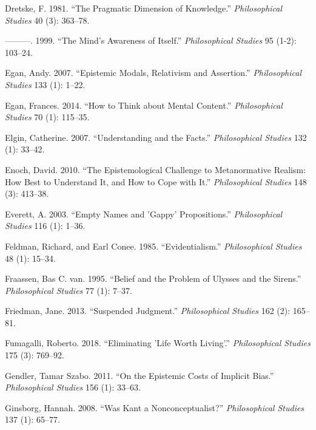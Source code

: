 \documentclass[
  10pt,
  letterpaper,
  DIV=11,
  numbers=noendperiod,
  twoside]{scrartcl}
\newlength{\cslhangindent}
\newenvironment{CSLReferences}[2] %
 {\begin{list}{}{%
  \setlength{\itemindent}{0pt}
  \setlength{\leftmargin}{0pt}
  \setlength{\parsep}{0pt}
  \ifodd #1
   \setlength{\leftmargin}{\cslhangindent}
   \setlength{\itemindent}{-1\cslhangindent}
  \fi
  \setlength{\itemsep}{#2\baselineskip}}}
 {\end{list}}
\begin{document}
\begin{CSLReferences}{1}{0}
Dretske, F. 1981. {``The Pragmatic Dimension of Knowledge.''}
\emph{Philosophical Studies} 40 (3): 363--78.

---------. 1999. {``The Mind's Awareness of Itself.''}
\emph{Philosophical Studies} 95 (1-2): 103--24.

Egan, Andy. 2007. {``Epistemic Modals, Relativism and Assertion.''}
\emph{Philosophical Studies} 133 (1): 1--22.

Egan, Frances. 2014. {``How to Think about Mental Content.''}
\emph{Philosophical Studies} 70 (1): 115--35.

Elgin, Catherine. 2007. {``Understanding and the Facts.''}
\emph{Philosophical Studies} 132 (1): 33--42.

Enoch, David. 2010. {``The Epistemological Challenge to Metanormative
Realism: How Best to Understand It, and How to Cope with It.''}
\emph{Philosophical Studies} 148 (3): 413--38.

Everett, A. 2003. {``Empty Names and 'Gappy' Propositions.''}
\emph{Philosophical Studies} 116 (1): 1--36.

Feldman, Richard, and Earl Conee. 1985. {``Evidentialism.''}
\emph{Philosophical Studies} 48 (1): 15--34.

Fraassen, Bas C. van. 1995. {``Belief and the Problem of Ulysses and the
Sirens.''} \emph{Philosophical Studies} 77 (1): 7--37.

Friedman, Jane. 2013. {``Suspended Judgment.''} \emph{Philosophical
Studies} 162 (2): 165--81.

Fumagalli, Roberto. 2018. {``Eliminating 'Life Worth Living'.''}
\emph{Philosophical Studies} 175 (3): 769--92.

Gendler, Tamar Szabo. 2011. {``On the Epistemic Costs of Implicit
Bias.''} \emph{Philosophical Studies} 156 (1): 33--63.

Ginsborg, Hannah. 2008. {``Was Kant a Nonconceptualist?''}
\emph{Philosophical Studies} 137 (1): 65--77.


\end{CSLReferences}
\end{document}
